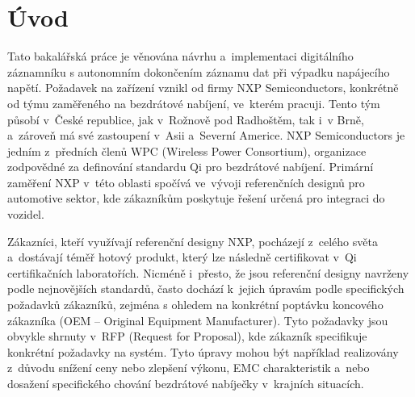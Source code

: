
%

\chapter{Úvod}
\label{uvod}
Tato bakalářská práce je věnována návrhu a~implementaci digitálního záznamníku s autonomním dokončením záznamu dat při výpadku napájecího napětí. Požadavek na zařízení vznikl od firmy NXP Semiconductors, konkrétně od týmu zaměřeného na bezdrátové nabíjení, ve~kterém pracuji. Tento tým působí v~České republice, jak v~Rožnově pod Radhoštěm, tak i~v Brně, a~zároveň má své zastoupení v~Asii a~Severní Americe. NXP Semiconductors je jedním z~předních členů WPC (Wireless Power Consortium), organizace zodpovědné za definování standardu Qi pro bezdrátové nabíjení. Primární zaměření NXP v~této oblasti spočívá ve~vývoji referenčních designů pro automotive sektor, kde zákazníkům poskytuje řešení určená pro integraci do vozidel.

Zákazníci, kteří využívají referenční designy NXP, pocházejí z~celého světa a~dostávají téměř hotový produkt, který lze následně certifikovat v~Qi certifikačních laboratořích. Nicméně i~přesto, že jsou referenční designy navrženy podle nejnovějších standardů, často dochází k~jejich úpravám podle specifických požadavků zákazníků, zejména s ohledem na konkrétní poptávku koncového zákazníka (OEM -- Original Equipment Manufacturer). Tyto požadavky jsou obvykle shrnuty v~RFP (Request for Proposal), kde zákazník specifikuje konkrétní požadavky na systém. Tyto úpravy mohou být například realizovány z~důvodu snížení ceny nebo zlepšení výkonu, EMC charakteristik a~nebo dosažení specifického chování bezdrátové nabíječky v~krajních situacích. 

